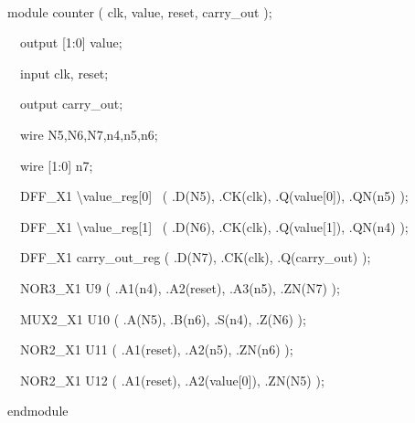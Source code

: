 \documentclass[a4paper]{article}
\begin{document}
{\centering\color[rgb]{0.0,0.0,0.039215688}
\textrm{\ \ }\textrm{\ \ }\textrm{\ \ }
\par}

\begin{center}
\begin{minipage}{6.06667in}
{\ttfamily\color[rgb]{0.0,0.0,0.039215688}
module counter ( clk, value, reset, carry\_out );}

{\ttfamily\color[rgb]{0.0,0.0,0.039215688}
\ \ output [1:0] value;}

{\ttfamily\color[rgb]{0.0,0.0,0.039215688}
\ \ input clk, reset;}

{\ttfamily\color[rgb]{0.0,0.0,0.039215688}
\ \ output carry\_out;}

{\ttfamily\color[rgb]{0.0,0.0,0.039215688}
\ \ wire N5,N6,N7,n4,n5,n6;}

{\ttfamily\color[rgb]{0.0,0.0,0.039215688}
\ \ wire [1:0] n7;}


\bigskip

{\ttfamily\color[rgb]{0.0,0.0,0.039215688}
\ \ DFF\_X1 {\textbackslash}value\_reg[0] \ ( .D(N5), .CK(clk),
.Q(value[0]), .QN(n5) );}

{\ttfamily\color[rgb]{0.0,0.0,0.039215688}
\ \ DFF\_X1 {\textbackslash}value\_reg[1] \ ( .D(N6), .CK(clk),
.Q(value[1]), .QN(n4) );}

{\ttfamily\color[rgb]{0.0,0.0,0.039215688}
\ \ DFF\_X1 carry\_out\_reg ( .D(N7), .CK(clk), .Q(carry\_out) );}

{\ttfamily\color[rgb]{0.0,0.0,0.039215688}
\ \ NOR3\_X1 U9 ( .A1(n4), .A2(reset), .A3(n5), .ZN(N7) );}

{\ttfamily\color[rgb]{0.0,0.0,0.039215688}
\ \ MUX2\_X1 U10 ( .A(N5), .B(n6), .S(n4), .Z(N6) );}

{\ttfamily\color[rgb]{0.0,0.0,0.039215688}
\ \ NOR2\_X1 U11 ( .A1(reset), .A2(n5), .ZN(n6) );}

{\ttfamily\color[rgb]{0.0,0.0,0.039215688}
\ \ NOR2\_X1 U12 ( .A1(reset), .A2(value[0]), .ZN(N5) );}

{\ttfamily\color[rgb]{0.0,0.0,0.039215688}
endmodule}


\bigskip
\end{minipage}
\end{center}

\bigskip


\bigskip


\bigskip


\bigskip


\bigskip


\bigskip
\end{document}
